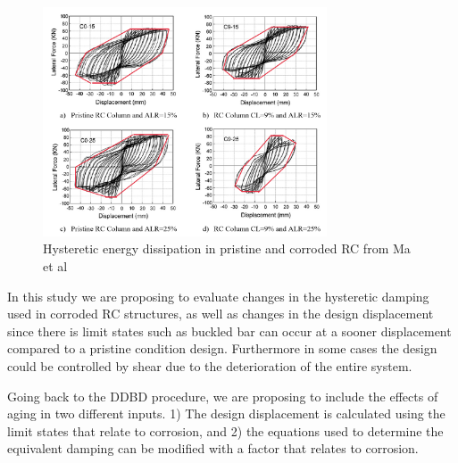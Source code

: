 \begin{figure}[htbp]
	\centering
    \includegraphics[width=0.75\textwidth]{VAC Prelim 2.0/Chapter-5/figs/Ma_HystereticArea_01.png}
	\caption{Hysteretic energy dissipation in pristine and corroded RC from Ma et al \cite{Meda2014}}
	\label{fig:DDBD_sum}
\end{figure}

In this study we are proposing to evaluate changes in the hysteretic damping used in corroded RC structures, as well as changes in the design displacement since there is limit states such as buckled bar can occur at a sooner displacement compared to a pristine condition design. Furthermore in some cases the design could be controlled by shear due to the deterioration of the entire system.

Going back to the DDBD procedure, we are proposing to include the effects of aging in two different inputs. 1) The design displacement is calculated using the limit states that relate to corrosion, and 2) the equations used to determine the equivalent damping can be modified with a factor that relates to corrosion.
